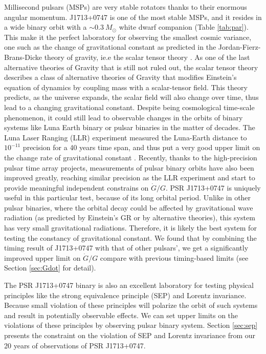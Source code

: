 Millisecond pulsars (MSPs) are very stable rotators thanks to their enormous angular momentum. J1713+0747 is one of
the most stable MSPs, and it resides in a wide binary orbit
with a $\sim0.3~M_{\odot}$ white dwarf companion (Table \ref{tab:par}). This make it the
perfect laboratory for observing the smallest cosmic variance, one such as the
change of gravitational constant as predicted in the Jordan-Fierz-Brans-Dicke
theory of gravity, ie.e the scalar tensor theory \citep{jor59,fie56,bd61}. 
As one of the last alternative theories of Gravity that is still not
ruled out, the scalar tensor theory describes a class of alternative theories of Gravity
that modifies Einstein's equation of dynamics by coupling mass with a scalar-tensor field.
This theory predicts, as the universe expands, the scalar field will
also change over time, thus lead to a changing gravitational constant. Despite
being cosmological time-scale phenomenon, it could still lead to observable 
changes in the orbits of binary systems like Luna Earth binary or pulsar
binaries in the matter of decades. The Luna Laser Ranging (LLR) experiment measured the
Luna-Earth distance to $10^{-11}$ precision for a 40 years time span, and thus put a very good upper limit on the change rate of gravitational constant
\citep{hmb10}. Recently, thanks to the high-precision pulsar time array
projects, measurements of pulsar binary orbits have also been improved
greatly, reaching similar precision as the LLR experiment and start to provide
meaningful independent constrains on $\dot{G}/G$. PSR J1713+0747 is uniquely
useful in this particular test, because of its long orbital period. Unlike in
other pulsar binaries, where the orbital decay could be affected by
gravitational wave radiation (as predicted by Einstein's GR or by 
alternative theories), this system has very small gravitational radiations. 
Therefore, it is likely the best system for testing the constancy of
gravitational constant. We found that by combining the timing result of
J1713+0747 with that of other pulsars', we get a significantly 
improved upper limit on $\dot{G}/G$ compare with previous timing-based 
limits (see Section \ref{sec:Gdot} for detail).

The PSR J1713+0747 binary is also an excellent laboratory for testing physical 
principles like the strong equivalence principle (SEP) and Lorentz invariance. 
Because small violation of these principles will polarize the orbit of such systems and result in potentially observable effects. We can set upper limits on the violations of these principles by observing pulsar binary system. Section \ref{sec:sep} presents the constraint on the violation of SEP and Lorentz invariance from our 20 years of observations of PSR J1713+0747.


